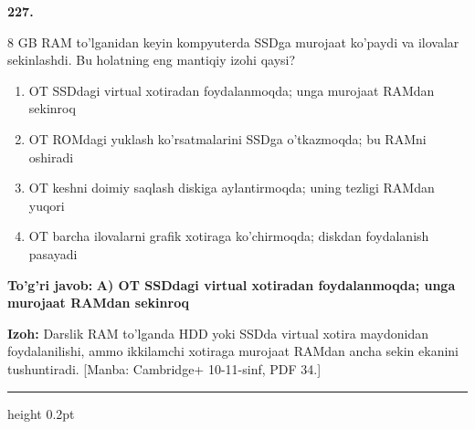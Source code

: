 \documentclass[10pt,a4paper]{article}
\begin{document}
{\bfseries\sffamily\color{ink} 227.}
\par
8 GB RAM to'lganidan keyin kompyuterda SSDga murojaat ko'paydi va ilovalar sekinlashdi. Bu holatning eng mantiqiy izohi qaysi?
\begin{enumerate}[label=\Alph*),leftmargin=9mm]
\item OT SSDdagi virtual xotiradan foydalanmoqda; unga murojaat RAMdan sekinroq
\item OT ROMdagi yuklash ko'rsatmalarini SSDga o'tkazmoqda; bu RAMni oshiradi
\item OT keshni doimiy saqlash diskiga aylantirmoqda; uning tezligi RAMdan yuqori
\item OT barcha ilovalarni grafik xotiraga ko'chirmoqda; diskdan foydalanish pasayadi
\end{enumerate}
\begin{tcolorbox}[enhanced,breakable,colback=teal!4,colframe=teal!60!black,boxrule=0.45pt,arc=1.2mm,left=2.7mm,right=2.7mm,top=1.8mm,bottom=1.8mm,before skip=2mm,after skip=2mm]
{\bfseries\sffamily\color{teal}To'g'ri javob:} \textbf{A) OT SSDdagi virtual xotiradan foydalanmoqda; unga murojaat RAMdan sekinroq}
\par\smallskip
{\bfseries Izoh:} Darslik RAM to'lganda HDD yoki SSDda virtual xotira maydonidan foydalanilishi, ammo ikkilamchi xotiraga murojaat RAMdan ancha sekin ekanini tushuntiradi. [Manba: Cambridge+ 10-11-sinf, PDF 34.]
\end{tcolorbox}
\vspace{2mm}\hrule height 0.2pt\vspace{3mm}
\end{document}
